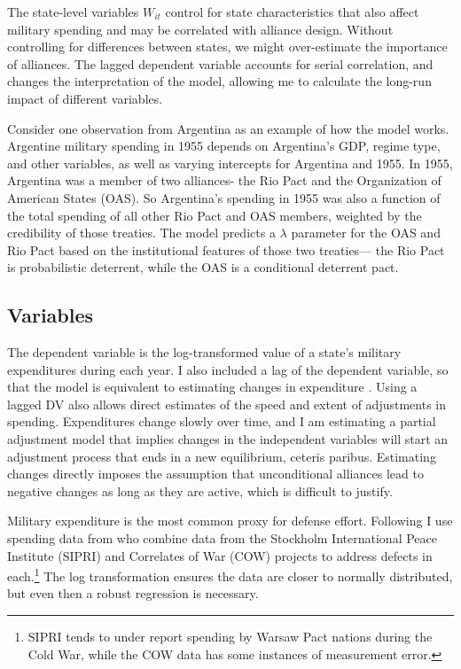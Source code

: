 \documentclass[12pt]{article}
\begin{document}
The state-level variables $W_{it}$ control for state characteristics that also affect military spending and may be correlated with alliance design. Without controlling for differences between states, we might over-estimate the importance of alliances. The lagged dependent variable accounts for serial correlation, and changes the interpretation of the model, allowing me to calculate the long-run impact of different variables. 

Consider one observation from Argentina as an example of how the model works. Argentine military spending in 1955 depends on Argentina's GDP, regime type, and other variables, as well as varying intercepts for Argentina and 1955. In 1955, Argentina was a member of two alliances- the Rio Pact and the Organization of American States (OAS). So Argentina's spending in 1955 was also a function of the total spending of all other Rio Pact and OAS members, weighted by the credibility of those treaties. The model predicts a $\lambda$ parameter for the OAS and Rio Pact based on the institutional features of those two treaties--- the Rio Pact is probabilistic deterrent, while the OAS is a conditional deterrent pact. 

\subsection*{Variables} 

The dependent variable is the log-transformed value of a state's military expenditures during each year. I also included a lag of the dependent variable, so that the model is equivalent to estimating changes in expenditure \cite{DeBoefKeele2008}. Using a lagged DV also allows direct estimates of the speed and extent of adjustments in spending. Expenditures change slowly over time, and I am estimating a partial adjustment model that implies changes in the independent variables will start an adjustment process that ends in a new equilibrium, ceteris paribus. Estimating changes directly imposes the assumption that unconditional alliances lead to negative changes as long as they are active, which is difficult to justify. 

Military expenditure is the most common proxy for defense effort. Following \citet{DigiuseppePoast2016} I use spending data from \citet{Nordhausetal2012} who combine data from the Stockholm International Peace Institute (SIPRI) and Correlates of War (COW) projects to address defects in each.\footnote{SIPRI tends to under report spending by Warsaw Pact nations during the Cold War, while the COW data has some instances of measurement error.} The log transformation ensures the data are closer to normally distributed, but even then a robust regression is necessary. 
\end{document}

